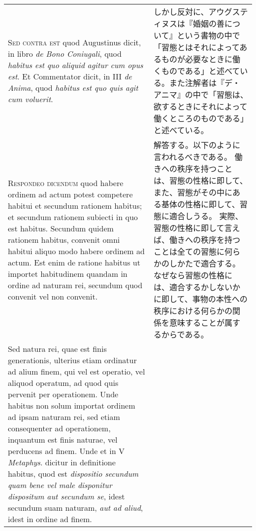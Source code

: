 \documentclass[10pt]{jsarticle} %
\begin{document}
\begin{longtable}{p{21em}p{21em}}
\\



{\scshape Sed contra est} quod Augustinus dicit, in libro {\itshape de Bono Coniugali}, quod
{\itshape habitus est quo aliquid agitur cum opus est}. Et Commentator dicit, in
III {\itshape de Anima}, quod {\itshape habitus est quo quis agit cum voluerit}.

&

しかし反対に、アウグスティヌスは『婚姻の善について』という書物の中で
「習態とはそれによってあるものが必要なときに働くものである」と述べてい
る。また注解者は『デ・アニマ』の中で「習態は、欲するときにそれによって
働くところのものである」と述べている。



\\



{\scshape Respondeo dicendum} quod habere ordinem ad actum potest competere
habitui et secundum rationem habitus; et secundum rationem subiecti in
quo est habitus. Secundum quidem rationem habitus, convenit omni
habitui aliquo modo habere ordinem ad actum. Est enim de ratione
habitus ut importet habitudinem quandam in ordine ad naturam rei,
secundum quod convenit vel non convenit. 



&

解答する。以下のように言われるべきである。
働きへの秩序を持つことは、習態の性格に即して、また、習態がその中にある基体の性格に即して、習態に適合しうる。
実際、習態の性格に即して言えば、働きへの秩序を持つことは全ての習態に何らかのしかたで適合する。
なぜなら習態の性格には、適合するかしないかに即して、事物の本性への秩序における何らかの関係を意味することが属するからである。


\\

Sed natura rei, quae est
finis generationis, ulterius etiam ordinatur ad alium finem, qui vel
est operatio, vel aliquod operatum, ad quod quis pervenit per
operationem. Unde habitus non solum importat ordinem ad ipsam naturam
rei, sed etiam consequenter ad operationem, inquantum est finis
naturae, vel perducens ad finem. Unde et in V {\itshape Metaphys}. dicitur in
definitione habitus, quod est {\itshape dispositio secundum quam bene vel male
disponitur dispositum aut secundum se}, idest secundum suam naturam,
{\itshape aut ad aliud}, idest in ordine ad finem. 



&


\end{longtable}
\end{document}
